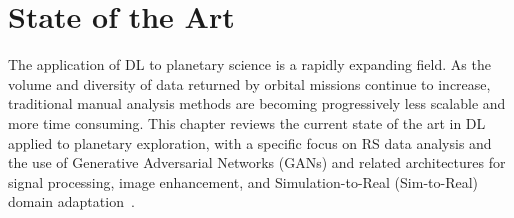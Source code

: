 \chapter{State of the Art}
\label{cha:soa}
The application of DL to planetary science is a rapidly expanding field.
As the volume and diversity of data returned by orbital missions continue to increase, traditional manual analysis methods are becoming progressively less scalable and more time consuming.
This chapter reviews the current state of the art in DL applied to planetary exploration, with a specific focus on RS data analysis and the use of Generative Adversarial Networks (GANs) and related architectures for signal processing, image enhancement, and Simulation-to-Real (Sim-to-Real) domain adaptation~\cite{yebasse2025advances}.





